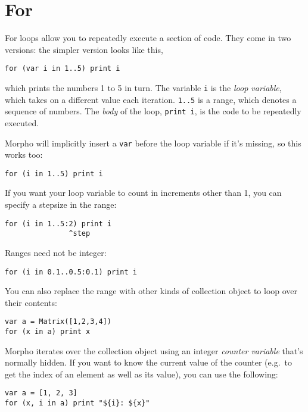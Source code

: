 \hypertarget{for}{%
\section{For}\label{for}}

For loops allow you to repeatedly execute a section of code. They come
in two versions: the simpler version looks like this,

\begin{lstlisting}
for (var i in 1..5) print i
\end{lstlisting}

which prints the numbers 1 to 5 in turn. The variable \texttt{i} is the
\emph{loop variable}, which takes on a different value each iteration.
\texttt{1..5} is a range, which denotes a sequence of numbers. The
\emph{body} of the loop, \texttt{print\ i}, is the code to be repeatedly
executed.

Morpho will implicitly insert a \texttt{var} before the loop variable if
it's missing, so this works too:

\begin{lstlisting}
for (i in 1..5) print i
\end{lstlisting}

If you want your loop variable to count in increments other than 1, you
can specify a stepsize in the range:

\begin{lstlisting}
for (i in 1..5:2) print i
               ^step
\end{lstlisting}

Ranges need not be integer:

\begin{lstlisting}
for (i in 0.1..0.5:0.1) print i
\end{lstlisting}

You can also replace the range with other kinds of collection object to
loop over their contents:

\begin{lstlisting}
var a = Matrix([1,2,3,4])
for (x in a) print x
\end{lstlisting}

Morpho iterates over the collection object using an integer
\emph{counter variable} that's normally hidden. If you want to know the
current value of the counter (e.g.~to get the index of an element as
well as its value), you can use the following:

\begin{lstlisting}
var a = [1, 2, 3]
for (x, i in a) print "${i}: ${x}"
\end{lstlisting}

